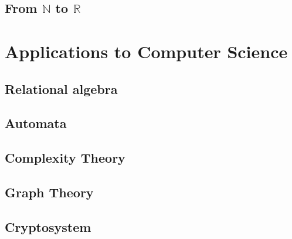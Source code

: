 \documentclass{report}
\theoremstyle{break}
\begin{document}
		\chapter{From $\mathbb{N}$ to $\mathbb{R}$}
			

	\part{Applications to Computer Science}
	
		\chapter{Relational algebra}
			
		
		\chapter{Automata}
			
		
		\chapter{Complexity Theory}
			
		
		\chapter{Graph Theory}
		    
		
		\chapter{Cryptosystem}
			
\end{document}
